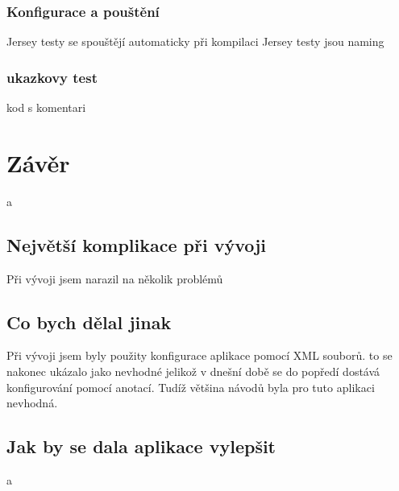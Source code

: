 \documentclass[czech,master,public,dept460,male,cpdeclaration,twoside]{diploma}
\begin{document}
\subsubsection{Konfigurace a pouštění}
Jersey testy se spouštějí automaticky při kompilaci 
Jersey testy jsou 
naming 

\subsubsection{ukazkovy test}
kod s komentari



\section{Závěr}
a

\subsection{Největší komplikace při vývoji}
Při vývoji jsem narazil na několik problémů

\subsection{Co bych dělal jinak}
Při vývoji jsem byly použity konfigurace aplikace pomocí XML souborů. to se nakonec ukázalo jako nevhodné jelikož v dnešní době se do popředí dostává konfigurování pomocí anotací. Tudíž většina návodů byla pro tuto aplikaci nevhodná.

\subsection{Jak by se dala aplikace vylepšit}
a


\newcommand{\registerToBib}[4]
{
\bibitem{#1}
	{\bf #2}
	{[cit. #3].}
	{\em Dostupne z: #4}
}
\end{document}
